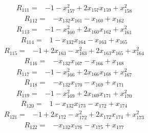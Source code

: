 {\begin{align*}
\end{align*}
\begin{align*}
R_{111} ={}& -1 - x_{157}^{2} + 2x_{157} x_{159} + x_{158}^{2}
\end{align*}
\begin{align*}
R_{112} ={}& -x_{132} x_{161} - x_{160} + x_{162}
\end{align*}
\begin{align*}
R_{113} ={}& -1 - x_{160}^{2} + 2x_{160} x_{162} + x_{161}^{2}
\end{align*}
\begin{align*}
R_{114} ={}& 1 - x_{132} x_{164} - x_{163} + x_{165}
\end{align*}
\begin{align*}
R_{115} ={}& -1 + 2x_{163} - x_{163}^{2} + 2x_{163} x_{165} + x_{164}^{2}
\end{align*}
\begin{align*}
R_{116} ={}& -x_{132} x_{167} - x_{166} + x_{168}
\end{align*}
\begin{align*}
R_{117} ={}& -1 - x_{166}^{2} + 2x_{166} x_{168} + x_{167}^{2}
\end{align*}
\begin{align*}
R_{118} ={}& -x_{132} x_{170} - x_{169} + x_{171}
\end{align*}
\begin{align*}
R_{119} ={}& -1 - x_{169}^{2} + 2x_{169} x_{171} + x_{170}^{2}
\end{align*}
\begin{align*}
R_{120} ={}& 1 - x_{132} x_{173} - x_{172} + x_{174}
\end{align*}
\begin{align*}
R_{121} ={}& -1 + 2x_{172} - x_{172}^{2} + 2x_{172} x_{174} + x_{173}^{2}
\end{align*}
\begin{align*}
R_{122} ={}& -x_{132} x_{176} - x_{175} + x_{177}
\end{align*}
\begin{align*}

\end{align*}}
